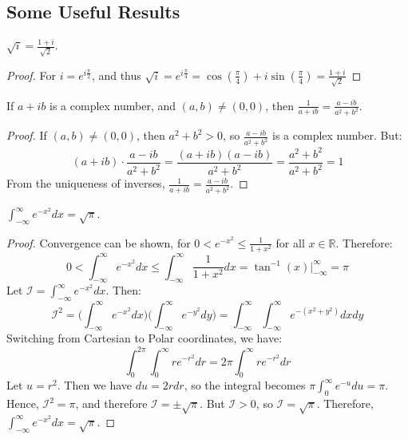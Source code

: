 \documentclass[crop=false,class=book,oneside]{standalone}
\begin{document}
        \subsection{Some Useful Results}
            \begin{theorem}
            $\sqrt{i} = \frac{1+i}{\sqrt{2}}$.
            \end{theorem}
            \begin{proof}
            For $i = e^{i\frac{\pi}{2}}$, and thus $\sqrt{i} = e^{i\frac{\pi}{4}} = \cos(\frac{\pi}{4})+i\sin(\frac{\pi}{4}) = \frac{1+i}{\sqrt{2}}$
            \end{proof}
            \begin{theorem}
            If $a+ib$ is a complex number, and $(a,b) \ne (0,0)$, then $\frac{1}{a+ib} = \frac{a-ib}{a^2+b^2}$.
            \end{theorem}
            \begin{proof}
            If $(a,b)\ne (0,0)$, then $a^2+b^2>0$, so $\frac{a-ib}{a^2+b^2}$ is a complex number. But:
            \begin{equation*}
                (a+ib)\cdot \frac{a-ib}{a^2+b^2} = \frac{(a+ib)(a-ib)}{a^2+b^2} = \frac{a^2+b^2}{a^2+b^2} = 1
            \end{equation*}
            From the uniqueness of inverses, $\frac{1}{a+ib} = \frac{a-ib}{a^2+b^2}$.
            \end{proof}
            \begin{theorem}
            $\int_{-\infty}^{\infty}e^{-x^2}dx = \sqrt{\pi}$.
            \end{theorem}
            \begin{proof}
            Convergence can be shown, for $0 < e^{-x^2} \leq \frac{1}{1+x^2}$ for all $x\in \mathbb{R}$. Therefore:
            \begin{equation*}
            0<\int_{-\infty}^{\infty} e^{-x^2}dx \leq \int_{-\infty}^{\infty} \frac{1}{1+x^2}dx = \tan^{-1}(x)\big|_{-\infty}^{\infty} = \pi
            \end{equation*}
            Let $\mathcal{I} = \int_{-\infty}^{\infty} e^{-x^2}dx$. Then:
            \begin{equation*}
                \mathcal{I}^2 = \bigg(\int_{-\infty}^{\infty}e^{-x^2}dx\bigg)\bigg(\int_{-\infty}^{\infty}e^{-y^2}dy\bigg) = \int_{-\infty}^{\infty}\int_{-\infty}^{\infty}e^{-(x^2+y^2)}dxdy
            \end{equation*}
            Switching from Cartesian to Polar coordinates, we have:
            \begin{equation*}
                \int_{0}^{2\pi}\int_{0}^{\infty} re^{-r^2}dr = 2\pi \int_{0}^{\infty}re^{-r^2}dr
            \end{equation*}
            Let $u = r^2$. Then we have $du = 2rdr$, so the integral becomes $\pi \int_{0}^{\infty} e^{-u}du = \pi$. Hence, $\mathcal{I}^2 = \pi$, and therefore $\mathcal{I} = \pm \sqrt{\pi}$. But $\mathcal{I} > 0$, so $\mathcal{I} = \sqrt{\pi}$. Therefore, $\int_{-\infty}^{\infty}e^{-x^2}dx = \sqrt{\pi}$. 
            \end{proof}
\end{document}
